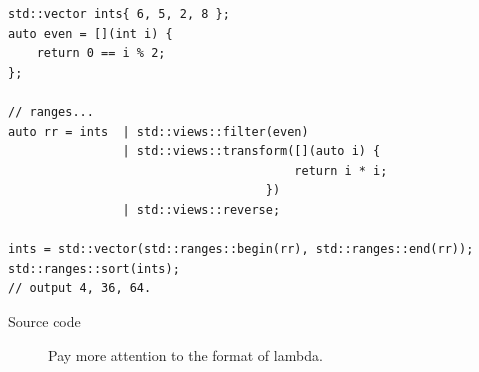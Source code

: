 \documentclass[a4paper,11pt,twoside]{book}
\begin{document}
\begin{itemize}
\begin{lstlisting}
std::vector ints{ 6, 5, 2, 8 };
auto even = [](int i) {
	return 0 == i % 2;
};

// ranges...
auto rr = ints  | std::views::filter(even) 
				| std::views::transform([](auto i) {
										return i * i;
									})
				| std::views::reverse;

ints = std::vector(std::ranges::begin(rr), std::ranges::end(rr));
std::ranges::sort(ints);
// output 4, 36, 64.
\end{lstlisting}	
\begin{description}
	\item[Source code] Pay more attention to the format of lambda.
\end{description}


\end{itemize}
\end{document}
